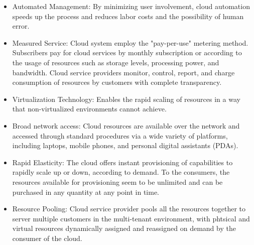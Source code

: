 \begin{itemize}
    \item Automated Management: By minimizing user involvement, cloud automation speeds up the process and reduces labor costs and the possibility of human error.
    \item Measured Service: Cloud system employ the "pay-per-use" metering method. Subscribers pay for cloud services by monthly subscription or according to the usage of resources such as storage levels, processing power, and bandwidth. Cloud service providers monitor, control, report, and charge consumption of resources by customers with complete transparency.
    \item Virtualization Technology: Enables the rapid scaling of resources in a way that non-virtualized environments cannot achieve.
    \item Broad network access: Cloud resources are available over the network and accessed through standard procedures via a wide variety of platforms, including laptops, mobile phones, and personal digital assistants (PDAs).
    \item Rapid Elasticity: The cloud offers instant provisioning of capabilities to rapidly scale up or down, according to demand. To the consumers, the resources available for provisioning seem to be unlimited and can be purchased in any quantity at any point in time.
    \item Resource Pooling: Cloud service provider pools all the resources together to server multiple customers in the multi-tenant environment, with phtsical and virtual resources dynamically assigned and reassigned on demand by the consumer of the cloud.
\end{itemize}
